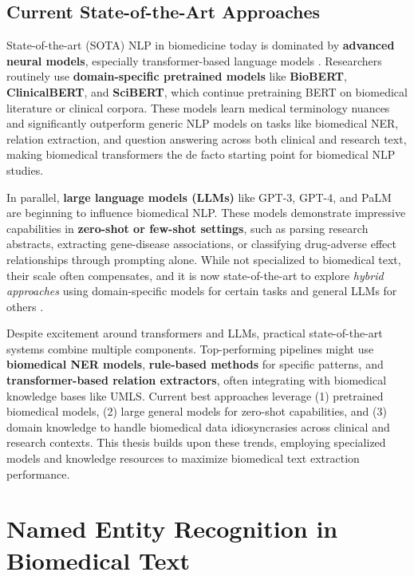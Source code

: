 \subsection{Current State-of-the-Art Approaches}

State-of-the-art (SOTA) NLP in biomedicine today is dominated by \textbf{advanced neural models}, especially transformer-based language models \parencite{Neumann2019}. Researchers routinely use \textbf{domain-specific pretrained models} like \textbf{BioBERT}, \textbf{ClinicalBERT}, and \textbf{SciBERT}, which continue pretraining BERT on biomedical literature or clinical corpora. These models learn medical terminology nuances and significantly outperform generic NLP models on tasks like biomedical NER, relation extraction, and question answering across both clinical and research text, making biomedical transformers the de facto starting point for biomedical NLP studies.

In parallel, \textbf{large language models (LLMs)} like GPT-3, GPT-4, and PaLM are beginning to influence biomedical NLP. These models demonstrate impressive capabilities in \textbf{zero-shot or few-shot settings}, such as parsing research abstracts, extracting gene-disease associations, or classifying drug-adverse effect relationships through prompting alone. While not specialized to biomedical text, their scale often compensates, and it is now state-of-the-art to explore \emph{hybrid approaches} using domain-specific models for certain tasks and general LLMs for others \parencite{Liu2024}.

Despite excitement around transformers and LLMs, practical state-of-the-art systems combine multiple components. Top-performing pipelines might use \textbf{biomedical NER models}, \textbf{rule-based methods} for specific patterns, and \textbf{transformer-based relation extractors}, often integrating with biomedical knowledge bases like UMLS. Current best approaches leverage (1) pretrained biomedical models, (2) large general models for zero-shot capabilities, and (3) domain knowledge to handle biomedical data idiosyncrasies across clinical and research contexts. This thesis builds upon these trends, employing specialized models and knowledge resources to maximize biomedical text extraction performance.

\section{Named Entity Recognition in Biomedical Text}

